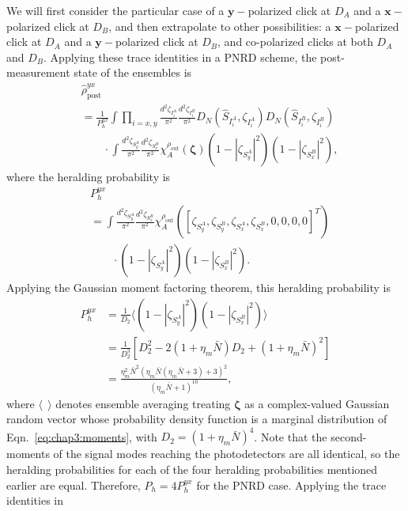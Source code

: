 \documentclass[aps,twocolumn,secnumarabic,amsmath,amssymb,pra,groupedaddress,
showpacs, showkeys,draft]{revtex4-1}
\newcommand{\pna}[1]{\left(#1\right)}
\newcommand{\pnb}[1]{\left[#1\right]}
\begin{document}
We will first consider the particular case of a $\mathbf{y}-$polarized click at
$D_A$ and a $\mathbf{x}-$polarized click at $D_B$, and then extrapolate to
other possibilities: a $\mathbf{x}-$polarized click at $D_A$ and a
$\mathbf{y}-$polarized click at $D_B$, and co-polarized clicks at both $D_A$
and $D_B$. Applying these trace identities in a PNRD scheme, the
post-measurement state of the ensembles is
\begin{align}
& \hat{\rho}_{\textrm{post}}^{yx} \nonumber \\
& = \frac{1}{P_{h}^{yx}}\int 
\prod_{i=x,y}
\frac{d^2 \zeta_{I_i^A}}{\pi^2} 
\frac{d^2 \zeta_{I_i^B}}{\pi^2} D_N\pna{\hat{S}_{I_i^A},\zeta_{I_i^A}} 
D_N\pna{\hat{S}_{I_i^B},\zeta_{I_i^B}}  \nonumber \\
& \qquad  \cdot \int 
\frac{d^2 \zeta_{S_y^A}}{\pi^2} 
\frac{d^2 \zeta_{S_x^B}}{\pi^2}
\chi_A^{\rho_{\textrm{out}}}\pna{\bm{\zeta}} \pna{1-|\zeta_{S_y^A}|^2}\pna{1-|\zeta_{S_x^B}|^2},
\end{align}
where the heralding probability is
\begin{align}
& P_{h}^{yx} \nonumber \\
& =\int 
\frac{d^2 \zeta_{S_y^A}}{\pi^2} 
\frac{d^2 \zeta_{S_x^B}}{\pi^2}\chi_A^{\rho_{\textrm{out}}}\pna{\pnb{\zeta_{S_y^A},\zeta_{S_y^B},\zeta_{S_x^A},\zeta_{S_x^B},0,0,0,0}^T}
\nonumber \\ 
& \qquad \cdot \pna{1-|\zeta_{S_y^A}|^2}\pna{1-|\zeta_{S_x^B}|^2}.
\end{align}
Applying the Gaussian moment factoring theorem, this heralding probability is
\begin{align}
P_{h}^{yx}&=\frac{1}{D_2}\langle \pna{1-|\zeta_{S_y^A}|^2}\pna{1-|\zeta_{S_x^B}|^2} \rangle \nonumber \\
	&=\frac{1}{D_2^3}\pnb{D_2^2-2\pna{1+\eta_{m}\bar{N}}D_2+\pna{1+\eta_{m}\bar{N}}^2} \nonumber \\
	& = \frac{\eta^2_{m} \bar{N}^2 (\eta_{m}  \bar{N} (\eta_{m}  \bar{N}+3)+3)^2}{(\eta_{m}  \bar{N}+1)^{10}},
\end{align}
where $\langle~~\rangle$ denotes ensemble averaging treating $\bm{\zeta}$ as a
complex-valued Gaussian random vector whose probability density function is a
marginal distribution of Eqn.~\ref{eq:chap3:moments}, with
$D_2=\pna{1+\eta_{m}\bar{N}}^4$. Note that the second-moments of
the signal modes reaching the photodetectors are all identical, so the
heralding probabilities for each of the four heralding probabilities mentioned
earlier are equal. Therefore, $P_{h}=4P_{h}^{yx}$
for the PNRD case. Applying the trace identities in
\end{document}
